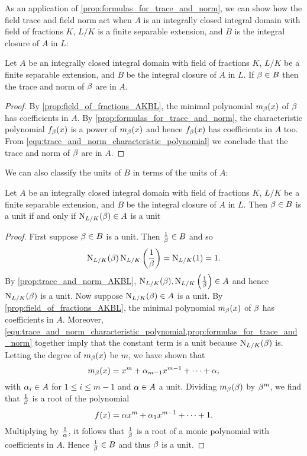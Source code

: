     As an application of \cref{prop:formulas_for_trace_and_norm}, we can show how the field trace and field norm act when $A$ is an integrally closed integral domain with field of fractions $K$, $L/K$ is a finite separable extension, and $B$ is the integral closure of $A$ in $L$:

    \begin{proposition}\label{prop:trace_and_norm_AKBL}
      Let $A$ be an integrally closed integral domain with field of fractions $K$, $L/K$ be a finite separable extension, and $B$ be the integral closure of $A$ in $L$. If $\beta \in B$ then the trace and norm of $\beta$ are in $A$.
    \end{proposition}
    \begin{proof}
      By \cref{prop:field_of_fractions_AKBL}, the minimal polynomial $m_{\beta}(x)$ of $\beta$ has coefficients in $A$. By \cref{prop:formulas_for_trace_and_norm}, the characteristic polynomial $f_{\beta}(x)$ is a power of $m_{\beta}(x)$ and hence $f_{\beta}(x)$ has coefficients in $A$ too. From \cref{equ:trace_and_norm_characteristic_polynomial} we conclude that the trace and norm of $\beta$ are in $A$.
    \end{proof}

    We can also classify the units of $B$ in terms of the units of $A$:

    \begin{proposition}\label{prop:unit_if_and_only_if_AKBL}
      Let $A$ be an integrally closed integral domain with field of fractions $K$, $L/K$ be a finite separable extension, and $B$ be the integral closure of $A$ in $L$. Then $\beta \in B$ is a unit if and only if $\operatorname{\mathrm{N}}_{L/K}(\beta) \in A$ is a unit
    \end{proposition}
    \begin{proof}
      First suppose $\beta \in B$ is a unit. Then $\frac{1}{\beta} \in B$ and so
      \[
        \operatorname{\mathrm{N}}_{L/K}(\beta)\operatorname{\mathrm{N}}_{L/K}\left(\frac{1}{\beta}\right) = \operatorname{\mathrm{N}}_{L/K}(1) = 1.
      \]
      By \cref{prop:trace_and_norm_AKBL}, $\operatorname{\mathrm{N}}_{L/K}(\beta),\operatorname{\mathrm{N}}_{L/K}\left(\frac{1}{\beta}\right) \in A$ and hence $\operatorname{\mathrm{N}}_{L/K}(\beta)$ is a unit. Now suppose $\operatorname{\mathrm{N}}_{L/K}(\beta) \in A$ is a unit. By \cref{prop:field_of_fractions_AKBL}, the minimal polynomial $m_{\beta}(x)$ of $\beta$ has coefficients in $A$. Moreover, \cref{equ:trace_and_norm_characteristic_polynomial,prop:formulas_for_trace_and_norm} together imply that the constant term is a unit because $\operatorname{\mathrm{N}}_{L/K}(\beta)$ is. Letting the degree of $m_{\beta}(x)$ be $m$, we have shown that
      \[
        m_{\beta}(x) = x^{m}+\alpha_{m-1}x^{m-1}+\cdots+\alpha,
      \]
      with $\alpha_{i} \in A$ for $1 \le i \le m-1$ and $\alpha \in A$ a unit. Dividing $m_{\beta}(\beta)$ by $\beta^{m}$, we find that $\frac{1}{\beta}$ is a root of the polynomial
      \[
        f(x) = \alpha x^{m}+\alpha_{1}x^{m-1}+\cdots+1.
      \]
      Multiplying by $\frac{1}{\alpha}$, it follows that $\frac{1}{\beta}$ is a root of a monic polynomial with coefficients in $A$. Hence $\frac{1}{\beta} \in B$ and thus $\beta$ is a unit.
    \end{proof}

